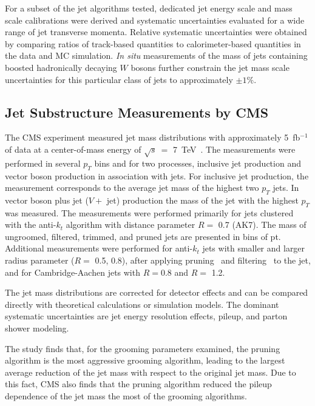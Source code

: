 For a subset of the jet algorithms tested, dedicated jet energy scale and 
mass scale calibrations were derived and systematic uncertainties evaluated 
for a wide range of jet transverse momenta. Relative systematic uncertainties 
were obtained by comparing ratios of track-based quantities to 
calorimeter-based quantities in the data and MC simulation. \textit{In situ} 
measurements of the mass of jets containing boosted hadronically 
decaying $W$ bosons further constrain the jet mass scale uncertainties for 
this particular class of jets to approximately $\pm1\%$.


\subsection{Jet Substructure Measurements by CMS}
\label{subsec:jsCMS}


The CMS experiment measured jet mass distributions with 
approximately 5~fb$^{-1}$ of data at a center-of-mass 
energy of $\sqrt{s}~=$ 7~TeV~\cite{Chatrchyan:2013rla}.
The measurements were performed in several $p_T$ bins and
for two processes, inclusive jet production and vector boson
production in association with jets. 
For inclusive jet production, the measurement
corresponds to the average jet mass of the highest
two $p_T$ jets. In vector boson plus jet ($V +$ jet) production
the mass of the jet with the highest $p_T$ was measured.
The measurements were performed primarily for jets clustered with the 
anti-$k_t$ algorithm with distance parameter $R=$ 0.7 (AK7).
 The mass of ungroomed, filtered, trimmed, and
pruned jets are presented in bins of pt.
Additional measurements were performed for anti-$k_t$ jets with smaller and
larger radius parameter ($R=$ 0.5, 0.8), after applying 
pruning~\cite{Ellis:2009me} and filtering~\cite{Butterworth:2008iy} 
to the jet, and for Cambridge-Aachen jets
with $R=$0.8 and $R=$ 1.2.  

The jet mass distributions are corrected for detector effects and can
be compared directly with theoretical calculations or simulation models.
The dominant systematic uncertainties are jet energy resolution effects, 
pileup, and parton shower modeling.

The study finds that, for the grooming parameters examined, the pruning 
algorithm is the most aggressive grooming algorithm, leading to the largest
average reduction of the jet mass with respect to the original jet mass.
Due to this fact, CMS also finds that the pruning algorithm reduced 
the pileup dependence of the jet mass the most of the grooming algorithms.

